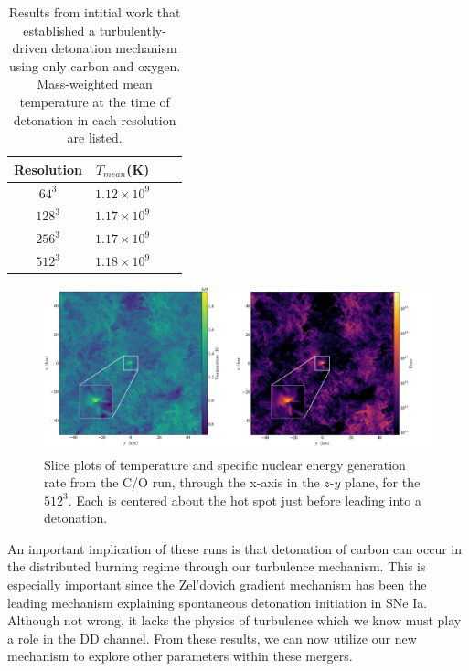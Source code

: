 \documentclass{aastex63}
\begin{document}
\begin{table}[htp]
\caption[A table of carbon-oxygen runs with different resolution, RMS velocity and mean temperature..]{Results from intitial work that established a turbulently-driven detonation mechanism using only carbon and oxygen. Mass-weighted mean temperature at the time of detonation in each resolution are listed.}
  \begin{center}
      \begin{tabular}{|c|c|c|c|}
        \hline
              Resolution & $T_{mean}$(K) \\
        \hline\hline
        $64^3$   & $1.12 \times 10^9$ \\
        $128^3$   & $1.17 \times 10^9$ \\
        $256^3$   & $1.17 \times 10^9$ \\
        $512^3$   & $1.18 \times 10^9$ \\
        \hline
   \end{tabular}
  \end{center}
  \label{runs}
\end{table}

\begin{center}
\begin{figure}[hp]

\includegraphics[width=1.0\textwidth]{combined_slice_carbon.png}
\centering
\caption[Slice plots of temperature and specific nuclear energy generation rate, through the maximum temperature in the $z$-$y$ plane, for the $512^3$ run]{Slice plots of temperature and specific nuclear energy generation rate from the C/O run, through the x-axis in the $z$-$y$ plane, for the $512^3$. Each is centered about the hot spot just before leading into a detonation.}
\label {fig:temp_enuc}

\end{figure}
\end{center}

An important implication of these runs is that detonation of carbon can occur in the distributed burning regime through our turbulence mechanism. This is especially important since the Zel'dovich gradient mechanism has been the leading mechanism explaining spontaneous detonation initiation in SNe Ia. Although not wrong, it lacks the physics of turbulence which we know must play a role in the DD channel. From these results, we can now utilize our new mechanism to explore other parameters within these mergers.
\end{document}
